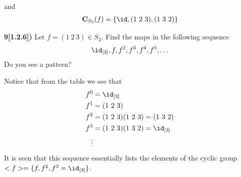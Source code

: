 \documentclass[12pt,a4paper]{article}
\newcommand{\prob}[2]{\textbf{#1)} #2}
\begin{document}
and 
\begin{align*}
\mathbf{C}_{S_3}(f) = \{\id,(1~2~3),(1~3~2)\}
\end{align*}

\prob{9[1.2.6]}{Let $f = (1~2~3) \in S_3$. Find the maps in the following sequence
\begin{align*}
\id_{[3]},f,f^2,f^3,f^4,f^5,\hdots
\end{align*}
Do you see a pattern?}

Notice that from the table we see that
\begin{align*}
f^{0} &= \id_{[3]} \\
f^{1} &= (1~2~3) \\
f^{2} &= (1~2~3)(1~2~3) = (1~3~2) \\
f^{3} &= (1~2~3)(1~3~2) = \id_{[3]} \\
\vdots
\end{align*}
It is seen that this sequence essentially lists the elements of the cyclic group $<f> = \{f,f^2,f^3=\id_{[3]}\}$.
\end{document}
